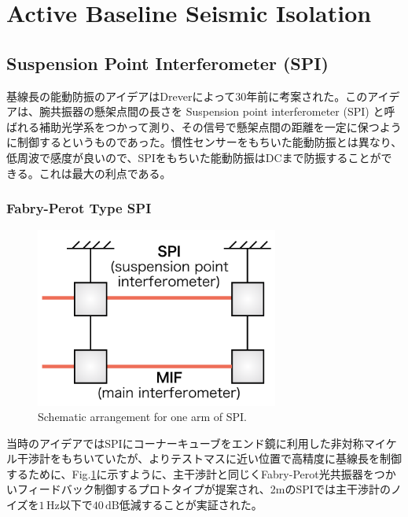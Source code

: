 \section{Active Baseline Seismic Isolation}
\subsection{Suspension Point Interferometer (SPI)}
基線長の能動防振のアイデアはDreverによって30年前に考案された。このアイデアは、腕共振器の懸架点間の長さを Suspension point interferometer (SPI) と呼ばれる補助光学系をつかって測り、その信号で懸架点間の距離を一定に保つように制御するというものであった\cite{drever1987outline}。慣性センサーをもちいた能動防振とは異なり、低周波で感度が良いので、SPIをもちいた能動防振はDCまで防振することができる。これは最大の利点である。

\subsubsection{Fabry-Perot Type SPI}
\begin{figure}[h]
  \begin{center}   
    \includegraphics[width=8cm]{./img_chap5/img508.png}
    \caption{Schematic arrangement for one arm of SPI.} \label{img:img508}
  \end{center}
\end{figure}
当時のアイデアではSPIにコーナーキューブをエンド鏡に利用した非対称マイケル干渉計をもちいていたが、よりテストマスに近い位置で高精度に基線長を制御するために、Fig.\ref{img:img508}に示すように、主干渉計と同じくFabry-Perot光共振器をつかいフィードバック制御するプロトタイプが提案され\cite{drever2002extension}、2mのSPIでは主干渉計のノイズを$1\,\mathrm{Hz}$以下で$40\,\mathrm{dB}$低減することが実証された\cite{aso2004stabilization}。

